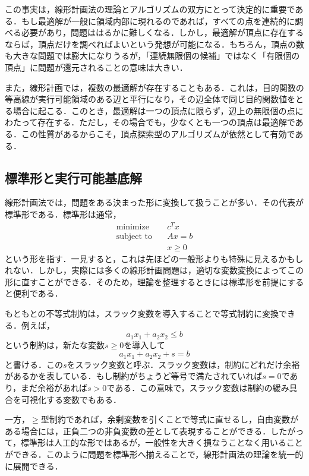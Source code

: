 この事実は，線形計画法の理論とアルゴリズムの双方にとって決定的に重要である．もし最適解が一般に領域内部に現れるのであれば，すべての点を連続的に調べる必要があり，問題ははるかに難しくなる．しかし，最適解が頂点に存在するならば，頂点だけを調べればよいという発想が可能になる．もちろん，頂点の数も大きな問題では膨大になりうるが，「連続無限個の候補」ではなく「有限個の頂点」に問題が還元されることの意味は大きい．

また，線形計画では，複数の最適解が存在することもある．これは，目的関数の等高線が実行可能領域のある辺と平行になり，その辺全体で同じ目的関数値をとる場合に起こる．このとき，最適解は一つの頂点に限らず，辺上の無限個の点にわたって存在する．ただし，その場合でも，少なくとも一つの頂点は最適解である．この性質があるからこそ，頂点探索型のアルゴリズムが依然として有効である．

\subsection{標準形と実行可能基底解}

線形計画法では，問題をある決まった形に変換して扱うことが多い．その代表が標準形である．標準形は通常，
\begin{align}
\text{minimize}\quad&c^Tx\\
\text{subject to}\quad&Ax=b\\
&x\ge 0
\end{align}
という形を指す．一見すると，これは先ほどの一般形よりも特殊に見えるかもしれない．しかし，実際には多くの線形計画問題は，適切な変数変換によってこの形に直すことができる．そのため，理論を整理するときには標準形を前提にすると便利である．

もともとの不等式制約は，スラック変数を導入することで等式制約に変換できる．例えば，
\begin{equation}
a_1x_1+a_2x_2\le b
\end{equation}
という制約は，新たな変数$s\ge 0$を導入して
\begin{equation}
a_1x_1+a_2x_2+s=b
\end{equation}
と書ける．この$s$をスラック変数と呼ぶ．スラック変数は，制約にどれだけ余裕があるかを表している．もし制約がちょうど等号で満たされていれば$s=0$であり，まだ余裕があれば$s>0$である．この意味で，スラック変数は制約の緩み具合を可視化する変数でもある．

一方，$\ge $型制約であれば，余剰変数を引くことで等式に直せるし，自由変数がある場合には，正負二つの非負変数の差として表現することができる．したがって，標準形は人工的な形ではあるが，一般性を大きく損なうことなく用いることができる．このように問題を標準形へ揃えることで，線形計画法の理論を統一的に展開できる．


